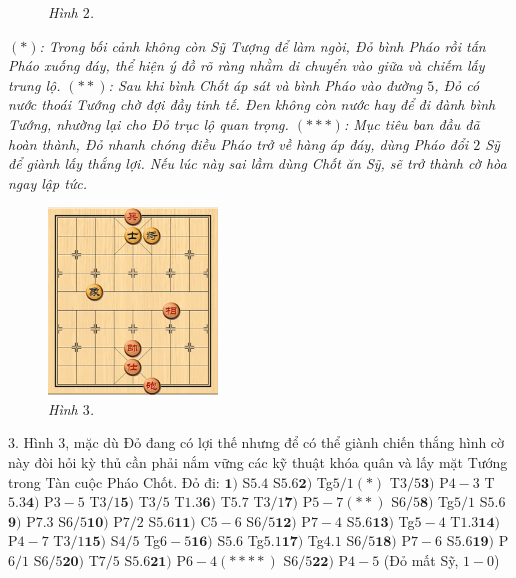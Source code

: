 \begin{multicols}{2}
\begin{figure}[H]
		\caption{\small\textit{\color{gocco}Hình $2$.}}
		\vspace*{-10pt}
	\end{figure}
	\textit{$(*)$: Trong bối cảnh không còn Sỹ Tượng để làm ngòi, Đỏ bình Pháo rồi tấn Pháo xuống đáy, thể hiện ý đồ rõ ràng nhằm di chuyển vào giữa và chiếm lấy trung lộ. 
	\vskip 0.1cm
	$(**)$: Sau khi bình Chốt áp sát và bình Pháo vào đường $5$, Đỏ có nước thoái Tướng chờ đợi đầy tinh tế. Đen không còn nước hay để đi đành bình Tướng, nhường lại cho Đỏ trục lộ quan trọng.
	\vskip 0.1cm
	$(***)$: Mục tiêu ban đầu đã hoàn thành, Đỏ nhanh chóng điều Pháo trở về hàng áp đáy, dùng Pháo đổi $2$ Sỹ để giành lấy thắng lợi. Nếu lúc này sai lầm dùng Chốt ăn Sỹ, sẽ trở thành cờ hòa ngay lập tức.}
	\begin{figure}[H]
		\vspace*{-5pt}
		\centering
		\captionsetup{labelformat= empty, justification=centering}
		\includegraphics[width= 0.4\textwidth]{3}
		\caption{\small\textit{\color{gocco}Hình $3$.}}
		\vspace*{-5pt}
	\end{figure}
	$3.$ Hình $3$, mặc dù Đỏ đang có lợi thế nhưng để có thể giành chiến thắng  hình cờ này đòi hỏi kỳ thủ cần phải nắm vững các kỹ thuật khóa quân và lấy mặt Tướng trong Tàn cuộc Pháo Chốt. Đỏ đi:
	\vskip 0.1cm
	$\pmb{1)}$	S$5.4$ S$5.6$\quad $\pmb{2)}$ Tg$5/1(*)$ T$3/5$\quad $\pmb{3)}$ P$4-3$ T$5.3$\quad $\pmb{4)}$ P$3-5$ T$3/1$\quad $\pmb{5)}$ T$3/5$ T$1.3$\quad $\pmb{6)}$ T$5.7$ T$3/1$\quad $\pmb{7)}$ P$5-7(**)$ S$6/5$\quad $\pmb{8)}$ Tg$5/1$ S$5.6$\quad $\pmb{9)}$ P$7.3$ S$6/5$\quad $\pmb{10)}$ P$7/2$ S$5.6$\quad $\pmb{11)}$ C$5-6$ S$6/5$\quad $\pmb{12)}$ P$7-4$ S$5.6$\quad $\pmb{13)}$ Tg$5-4$ T$1.3$\quad $\pmb{14)}$ P$4-7$ T$3/1$\quad $\pmb{15)}$ S$4/5$ Tg$6-5$\quad $\pmb{16)}$ S$5.6$ Tg$5.1$\quad $\pmb{17)}$ Tg$4.1$ S$6/5$\quad $\pmb{18)}$ P$7-6$ S$5.6$\quad $\pmb{19)}$ P$6/1$ S$6/5$\quad $\pmb{20)}$ T$7/5$ S$5.6$\quad $\pmb{21)}$ P$6-4(****)$ S$6/5$\quad $\pmb{22)}$ P$4-5$ (Đỏ mất Sỹ, $1-0$)

\end{multicols}
